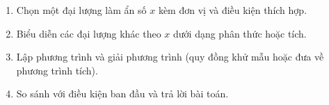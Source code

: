 \begin{enumerate}
\item Chọn một đại lượng làm ẩn số $x$ kèm đơn vị và điều kiện thích hợp.
\item Biểu diễn các đại lượng khác theo $x$ dưới dạng phân thức hoặc tích.
\item Lập phương trình và giải phương trình (quy đồng khử mẫu hoặc đưa về phương trình tích).
\item So sánh với điều kiện ban đầu và trả lời bài toán.
\end{enumerate}

